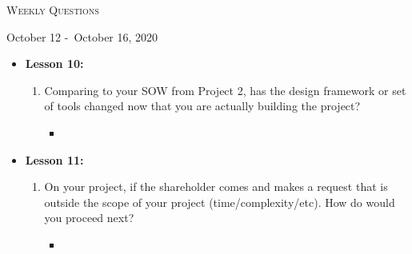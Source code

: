 \centerline{\LARGE\textsc{Weekly Questions}}
\centerline{October 12 -\ October 16, 2020}
\textbf{}
\begin{itemize}
  \item[] \textbf{\large Lesson 10:}
  \begin{enumerate}
    \item Comparing to your SOW from Project 2, has the design framework or set of tools changed now that you are actually building the project?
    \begin{itemize}
      \item 
    \end{itemize}
  \end{enumerate} 
\end{itemize}
\begin{itemize}
  \item[] \textbf{\large Lesson 11:}
  \begin{enumerate}
    \item On your project, if the shareholder comes and makes a request that is outside the scope of your project (time/complexity/etc). How do would you proceed next?
    \begin{itemize}
      \item 
    \end{itemize}
  \end{enumerate} 
\end{itemize}
